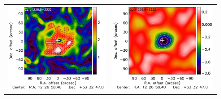 \documentclass[twocolumn,traditabstract]{aa}
\begin{document}
\begin{figure}[h]
{\begin{tabular}{ll}
\includegraphics[trim=0cm 2.2cm 0cm 0cm, clip=true, scale=1]{Figure/Grad_CLJ1227_20_30_60_noannot.pdf} & 
\includegraphics[trim=2.3cm 2.2cm 0cm 0cm, clip=true, scale=1]{Figure/DoG_CLJ1227_20_30_60_noannot.pdf} \\

\end{tabular}}
\end{figure}
\end{document}
